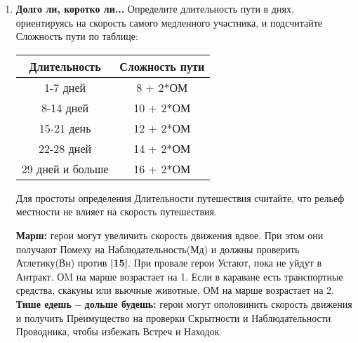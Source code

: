 \begin{enumerate}
    \item \textbf{Долго ли, коротко ли...} Определите длительность пути в днях, ориентируясь на скорость самого медленного участника, и подсчитайте Сложность пути по таблице:
      \begin{center} \begin{tabular}{|c|c|} \hline
        \textbf{Длительность} & \textbf{Сложность пути} \\ \hline
        1-7 дней & 8 + 2*ОМ \\ \hline
        8-14 дней & 10 + 2*ОМ \\ \hline
        15-21 день & 12 + 2*ОМ \\ \hline
        22-28 дней & 14 + 2*ОМ \\ \hline
        29 дней и больше & 16 + 2*ОМ \\ \hline
      \end{tabular} \end{center}
      \begin{tcolorbox}
        Для простоты определения Длительности путешествия считайте, что рельеф местности не влияет на скорость путешествия.
      \end{tcolorbox}
      \textbf{Марш:} герои могут увеличить скорость движения вдвое. При этом они получают Помеху на Наблюдательность(Мд) и должны проверить Атлетику(Вн) против \textbf{|15|}. При провале герои  Устают, пока не уйдут в Антракт. 
      \newline ОM на марше возрастает на 1. Если в караване есть транспортные средства, скакуны или вьючные животные, ОМ на марше возрастает на 2.
      \newline \textbf{Тише едешь – дольше будешь:} герои могут ополовинить скорость движения и получить Преимущество на проверки Скрытности и Наблюдательности Проводника, чтобы избежать Встреч и Находок.


\end{enumerate}
